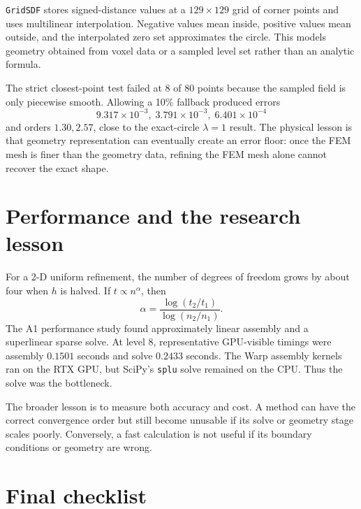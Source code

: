 \documentclass[11pt]{article}
\begin{document}
\texttt{GridSDF} stores signed-distance values at a $129\times129$ grid of
corner points and uses multilinear interpolation. Negative values mean
inside, positive values mean outside, and the interpolated zero set
approximates the circle. This models geometry obtained from voxel data or a
sampled level set rather than an analytic formula.

The strict closest-point test failed at 8 of 80 points because the sampled
field is only piecewise smooth. Allowing a 10\% fallback produced errors
\[
9.317\times10^{-3},\;3.791\times10^{-3},\;6.401\times10^{-4}
\]
and orders $1.30,2.57$, close to the exact-circle $\lambda=1$ result. The
physical lesson is that geometry representation can eventually create an
error floor: once the FEM mesh is finer than the geometry data, refining the
FEM mesh alone cannot recover the exact shape.

\section{Performance and the research lesson}

For a 2-D uniform refinement, the number of degrees of freedom grows by about
four when $h$ is halved. If $t\propto n^\alpha$, then
\[
 \alpha=\frac{\log(t_2/t_1)}{\log(n_2/n_1)}.
\]
The A1 performance study found approximately linear assembly and a
superlinear sparse solve. At level 8, representative GPU-visible timings
were assembly $0.1501$ seconds and solve $0.2433$ seconds. The Warp assembly
kernels ran on the RTX GPU, but SciPy's \texttt{splu} solve remained on the
CPU. Thus the solve was the bottleneck.

The broader lesson is to measure both accuracy and cost. A method can have
the correct convergence order but still become unusable if its solve or
geometry stage scales poorly. Conversely, a fast calculation is not useful if
its boundary conditions or geometry are wrong.

\section{Final checklist}
\end{document}
